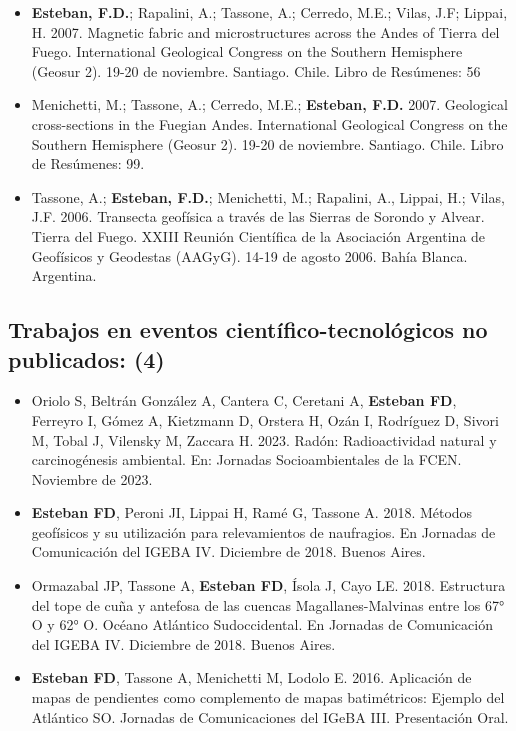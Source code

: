 \documentclass[11pt, a4paper]{article}
\begin{document}
\begin{itemize}
    \item \textbf{Esteban, F.D.}; Rapalini, A.; Tassone, A.; Cerredo, M.E.; Vilas, J.F; Lippai, H. 2007. Magnetic fabric and microstructures across the Andes of Tierra del Fuego. International Geological Congress on the Southern Hemisphere (Geosur 2). 19-20 de noviembre. Santiago. Chile. Libro de Resúmenes: 56
    \item Menichetti, M.; Tassone, A.; Cerredo, M.E.; \textbf{Esteban, F.D.} 2007. Geological cross-sections in the Fuegian Andes. International Geological Congress on the Southern Hemisphere (Geosur 2). 19-20 de noviembre. Santiago. Chile. Libro de Resúmenes: 99.
    \item Tassone, A.; \textbf{Esteban, F.D.}; Menichetti, M.; Rapalini, A., Lippai, H.; Vilas, J.F. 2006. Transecta geofísica a través de las Sierras de Sorondo y Alvear. Tierra del Fuego. XXIII Reunión Científica de la Asociación Argentina de Geofísicos y Geodestas (AAGyG). 14-19 de agosto 2006. Bahía Blanca. Argentina.
\end{itemize}


\subsection{Trabajos en eventos científico-tecnológicos no publicados: (4)}

\begin{itemize}
    \item Oriolo S, Beltrán González A, Cantera C, Ceretani A, \textbf{Esteban FD}, Ferreyro I, Gómez A, Kietzmann D, Orstera H, Ozán I, Rodríguez D, Sivori M, Tobal J, Vilensky M, Zaccara H. 2023. Radón: Radioactividad natural y carcinogénesis ambiental. En: Jornadas Socioambientales de la FCEN. Noviembre de 2023.
    \item \textbf{Esteban FD}, Peroni JI, Lippai H, Ramé G, Tassone A. 2018. Métodos geofísicos y su utilización para relevamientos de naufragios. En Jornadas de Comunicación del IGEBA IV. Diciembre de 2018. Buenos Aires.
    \item Ormazabal JP, Tassone A, \textbf{Esteban FD}, Ísola J, Cayo LE. 2018. Estructura del tope de cuña y antefosa de las cuencas Magallanes-Malvinas entre los 67° O y 62° O. Océano Atlántico Sudoccidental. En Jornadas de Comunicación del IGEBA IV. Diciembre de 2018. Buenos Aires.
    \item \textbf{Esteban FD}, Tassone A, Menichetti M, Lodolo E. 2016. Aplicación de mapas de pendientes como complemento de mapas batimétricos: Ejemplo del Atlántico SO. Jornadas de Comunicaciones del IGeBA III. Presentación Oral.
\end{itemize}
\end{document}
